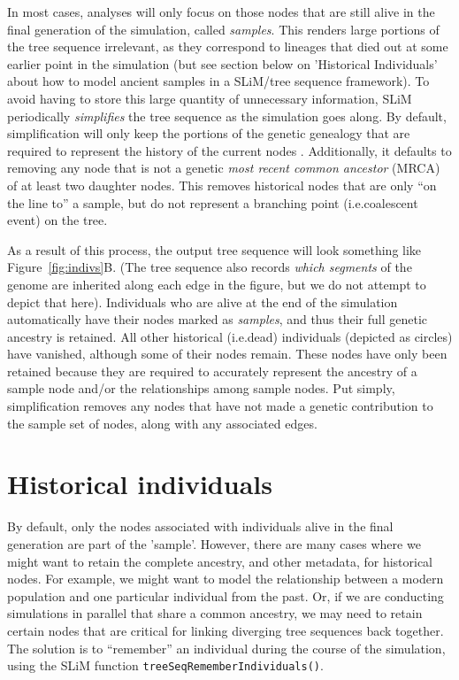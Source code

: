 \documentclass[12pt]{article}
\newcommand*{\ie}{i.e.\xcomma}
\begin{document}
In most cases, analyses will only focus on those nodes that are still alive in the final generation
of the simulation, called \textit{samples}. This renders large portions of the tree sequence irrelevant, as they
correspond to lineages that died out at some earlier point in the simulation (but see section below on
'Historical Individuals' about how to model ancient samples in a SLiM/tree sequence framework). To avoid having to
store this large quantity of unnecessary information, SLiM periodically \textit{simplifies} the tree sequence
as the simulation goes along. By default, simplification will only keep the portions of the
genetic genealogy that are required to represent the history of the current nodes
\citep{kelleher}. Additionally, it defaults to removing any node that is not a genetic
\textit{most recent common ancestor} (MRCA) of at least two daughter nodes. This removes historical
nodes that are only ``on the line to'' a sample, but do not represent a branching point
(\ie coalescent event) on the tree.

As a result of this process, the output tree sequence will look something like Figure~\ref{fig:indivs}B.
(The tree sequence also records \emph{which segments} of the genome are inherited
along each edge in the figure, but we do not attempt to depict that here).
Individuals who are alive at the end of the simulation automatically have their nodes marked as
\textit{samples}, and thus their full genetic ancestry is retained. All other historical (\ie dead)
individuals (depicted as circles) have vanished, although some of their nodes remain. These nodes
have only been retained because they are required to accurately represent the
ancestry of a sample node and/or the relationships among sample nodes. Put simply,
simplification removes any nodes that have not made a genetic contribution to the sample set of nodes,
along with any associated edges.

\section*{Historical individuals}
By default, only the nodes associated with individuals alive in the final generation are part of the 'sample'.
However, there are many cases where we might want to retain the complete ancestry, and other metadata, for
historical nodes. For example, we might want to model the relationship between a modern population and
one particular individual from the past.
Or, if we are conducting simulations in parallel that share 
a common ancestry, we may need to retain certain nodes that are critical for linking diverging
tree sequences back together.
The solution is to ``remember'' an individual during the course of the simulation,
using the SLiM function \verb|treeSeqRememberIndividuals()|.
\end{document}
